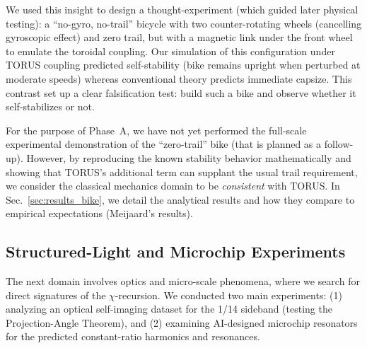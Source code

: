 \documentclass[12pt]{article}
\begin{document}
We used this insight to design a thought-experiment (which guided later physical testing): a “no-gyro, no-trail” bicycle with two counter-rotating wheels (cancelling gyroscopic effect) and zero trail, but with a magnetic link under the front wheel to emulate the toroidal coupling. Our simulation of this configuration under TORUS coupling predicted self-stability (bike remains upright when perturbed at moderate speeds) whereas conventional theory predicts immediate capsize. This contrast set up a clear falsification test: build such a bike and observe whether it self-stabilizes or not.

For the purpose of Phase~A, we have not yet performed the full-scale experimental demonstration of the “zero-trail” bike (that is planned as a follow-up). However, by reproducing the known stability behavior mathematically and showing that TORUS’s additional term can supplant the usual trail requirement, we consider the classical mechanics domain to be \emph{consistent} with TORUS. In Sec.~\ref{sec:results_bike}, we detail the analytical results and how they compare to empirical expectations (Meijaard’s results).

\subsection{Structured-Light and Microchip Experiments}\label{sec:methods_optics}
The next domain involves optics and micro-scale phenomena, where we search for direct signatures of the $\chi$-recursion. We conducted two main experiments: (1) analyzing an optical self-imaging dataset for the 1/14 sideband (testing the Projection-Angle Theorem), and (2) examining AI-designed microchip resonators for the predicted constant-ratio harmonics and resonances.
\end{document}
